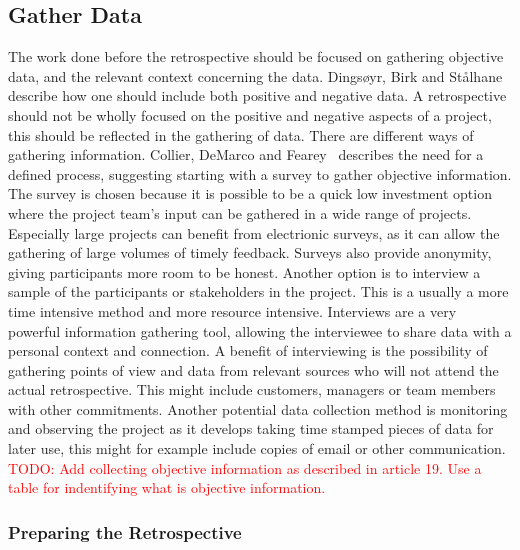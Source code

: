 \documentclass[12pt]{article}
\newcommand\todo[1]{\textcolor{red}{#1}}
\begin{document}
\subsection{Gather Data}
The work done before the retrospective should be focused on gathering objective data, and the relevant context concerning the data. Dingsøyr, Birk and Stålhane~\cite{Moe2001}  describe how one should include both positive and negative data. A retrospective should not be wholly focused on the positive and negative aspects of a project, this should be reflected in the gathering of data. There are different ways of gathering information. Collier, DeMarco and Fearey~\cite{Collier1996} describes the need for a defined process, suggesting starting with a survey to gather objective information. The survey is chosen because it is possible to be a quick low investment option where the project team's input can be gathered in a wide range of projects. Especially large projects can benefit from electrionic surveys, as it can allow the gathering of large volumes of timely feedback. Surveys also provide anonymity, giving participants more room to be honest. Another option is to interview a sample of the participants or stakeholders in the project. This is a usually a more time intensive method and more resource intensive. Interviews are a very powerful information gathering tool, allowing the interviewee to share data with a personal context and connection. A benefit of interviewing is the possibility of gathering points of view and data from relevant sources who will not attend the actual retrospective. This might include customers, managers or team members with other commitments. Another potential data collection method is monitoring and observing the project as it develops taking time stamped pieces of data for later use, this might for example include copies of email or other communication. 
\todo{TODO: Add collecting objective information as described in article 19. Use a table for indentifying what is objective information.}

\subsubsection{Preparing the Retrospective}
\end{document}
